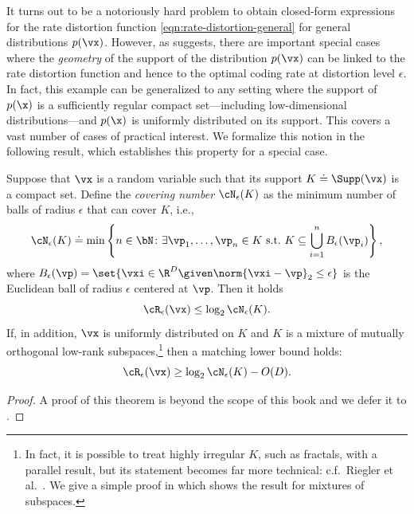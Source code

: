 \documentclass[../../book-main.tex]{subfiles}
\begin{document}
It turns out to be a notoriously hard problem to obtain closed-form expressions
for the rate distortion function \eqref{eqn:rate-distortion-general} for general
distributions $p(\vx)$. However, as
 suggests, there are important
special cases where the \textit{geometry} of the support of the distribution
$p(\vx)$ can be linked to the rate distortion function and hence to the optimal
coding rate at distortion level $\epsilon$.
In fact, this example can be generalized to any setting where the
support of $p(\x)$ is a sufficiently regular compact set—including
low-dimensional distributions—and $p(\x)$ is uniformly distributed on its
support.
This covers a vast number of cases of practical interest.
We formalize this notion in the following result, which establishes this
property for a special case.



\begin{theorem}\label{thm:covering-number-rate-distortion}
	Suppose that \(\vx\) is a random variable such that its support \(K \doteq \Supp(\vx)\) is a compact set. Define the \textit{covering number} \(\cN_{\epsilon}(K)\) as the minimum number of balls of radius \(\epsilon\) that can cover \(K\), i.e.,
	\begin{equation}
		\cN_{\epsilon}(K) \doteq \min\left\{n \in \bN \colon \exists \vp_{1}, \dots, \vp_{n} \in K\ \text{s.t.}\ K \subseteq \bigcup_{i = 1}^{n}B_{\epsilon}(\vp_{i})\right\},
	\end{equation}
	where \(B_{\epsilon}(\vp) = \set{\vxi\in \R^D \given \norm{\vxi - \vp}_2 \leq
	\epsilon}\) is the Euclidean ball of radius \(\epsilon\) centered at \(\vp\).
	Then it holds 
	\begin{equation}
		\cR_{\epsilon}(\vx) 
		\leq \log_{2} \cN_{\epsilon}(K).
	\end{equation}
	If, in addition, $\vx$ is uniformly distributed on $K$ and $K$ is
	a mixture of mutually orthogonal low-rank subspaces,\footnote{In fact, it is
	possible to treat highly irregular $K$, such as fractals, with a parallel
	result, but its statement
	becomes far more technical: c.f.\ Riegler et al.\
	\cite{Riegler2018-jh,Riegler2023-rr}. We give a simple proof in
	 which shows the result for mixtures of
	subspaces.}
	then a matching lower bound holds:
	\begin{equation}
		\cR_{\epsilon}(\vx)
		\geq
		\log_{2} \cN_{\epsilon}(K) - O(D).
	\end{equation}
\end{theorem}
\begin{proof}
A proof of this theorem is beyond the scope of this book and we defer it to .
\end{proof}
\end{document}
